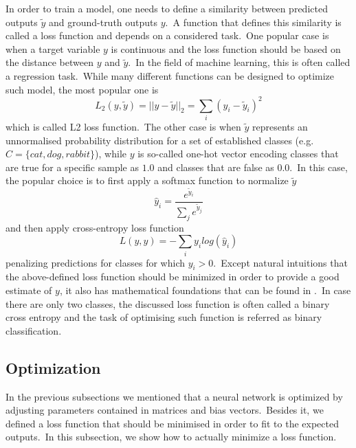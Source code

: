 \documentclass[longabstract, english, mgr]{iithesis}
\theoremstyle{default_theorem_style}\newtheorem{theorem}{Theorem}
\theoremstyle{default_theorem_style}\newtheorem{definition}{Definition}
\begin{document}
In order to train a model, one needs to define a similarity between predicted outputs $\tilde{y}$ and ground-truth
outputs $y$.\ A function that defines this similarity is called a loss function and depends on a considered
task.\ One popular case is when a target variable $y$ is continuous and the loss function should be based on the
distance between $y$ and $\tilde{y}$.\ In the field of machine learning, this is often called a regression
task.\ While many different functions can be designed to optimize such model, the most popular one is
$$
L_2(y, \tilde{y}) = ||y - \tilde{y}||_2 = \sum_i (y_i - \tilde{y}_i)^2
$$
which is called L2 loss function.\ The other case is when $\tilde{y}$ represents an unnormalised probability
distribution for a set of established classes (e.g.\ $C = \{cat, dog, rabbit\}$), while $y$ is so-called one-hot
vector encoding classes that are true for a specific sample as $1.0$ and classes that are false as $0.0$.\ In
this case, the popular choice is to first apply a softmax function to normalize $\tilde{y}$
$$
\hat{y}_i = \frac{e^{\tilde{y}_i}}{\sum_j e^{\tilde{y}_j}}
$$
and then apply cross-entropy loss function
$$
L(y, \hat{y}) = -\sum_i y_i log(\hat{y}_i)
$$
penalizing predictions for classes for which $y_i > 0$.\ Except natural intuitions that the above-defined loss
function should be minimized in order to provide a good estimate of $y$, it also has mathematical foundations that
can be found in \cite{goodfellow_book}.\ In case there are only two classes, the discussed loss function is often
called a binary cross entropy and the task of optimising such function is referred as binary classification.

\subsection{Optimization}\label{subsec:optimization}

In the previous subsections we mentioned that a neural network is optimized by adjusting parameters contained in
matrices and bias vectors.\ Besides it, we defined a loss function that should be minimised in order to fit to the
expected outputs.\ In this subsection, we show how to actually minimize a loss function.\newline
\end{document}
